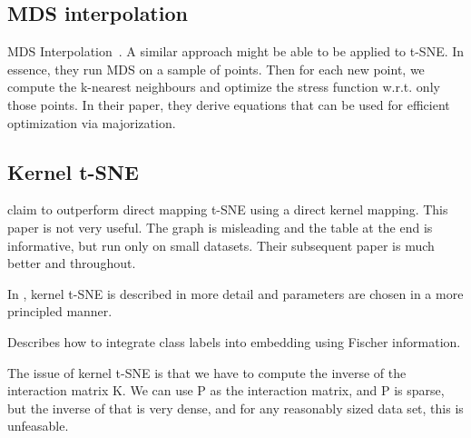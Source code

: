 \documentclass[11pt]{article}
\begin{document}
\subsection{MDS interpolation}
MDS Interpolation~\cite{bae2010dimension}. A similar approach might be able to be applied to t-SNE. In essence, they run MDS on a sample of points. Then for each new point, we compute the k-nearest neighbours and optimize the stress function w.r.t. only those points. In their paper, they derive equations that can be used for efficient optimization via majorization.

\subsection{Kernel t-SNE}
\cite{gisbrecht2012out} claim to outperform direct mapping t-SNE using a direct kernel mapping. This paper is not very useful. The graph is misleading and the table at the end is informative, but run only on small datasets. Their subsequent paper is much better and throughout.

In \cite{gisbrecht2015parametric}, kernel t-SNE is described in more detail and parameters are chosen in a more principled manner.

Describes how to integrate class labels into embedding using Fischer information.

The issue of kernel t-SNE is that we have to compute the inverse of the interaction matrix K. We can use P as the interaction matrix, and P is sparse, but the inverse of that is very dense, and for any reasonably sized data set, this is unfeasable.




\end{document}
